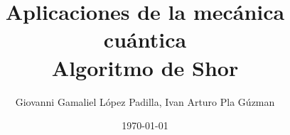 \documentclass[aspectratio=169]{beamer}
\title[]{Aplicaciones de la mecánica cuántica\\Algoritmo de Shor}
\author{Giovanni Gamaliel López Padilla, Ivan Arturo Pla Gúzman}
\date{\today}
\begin{document}
\begin{frame}[plain]
\maketitle
\end{frame}







\end{document}
